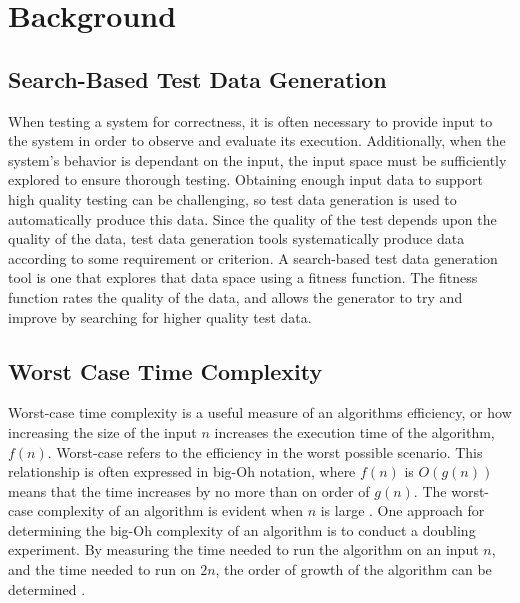 
\section{Background}


\subsection{Search-Based Test Data Generation}
When testing a system for correctness, it is often necessary to
provide input to the system in order to observe and evaluate its
execution. Additionally, when the system's behavior is dependant on the
input, the input space must be sufficiently explored to ensure thorough
testing.  Obtaining enough input data to support high quality testing can
be challenging, so test data generation is used to automatically
produce this data. Since the quality of the test depends upon the
quality of the data, test data generation tools systematically produce data
according to some requirement or criterion. A search-based test data 
generation tool is one that explores that data space using a fitness
function.  The fitness function rates the quality of the data, and allows
the generator to try and improve by searching for higher quality test data.




\subsection{Worst Case Time Complexity}

Worst-case time complexity is a useful measure of an algorithms
efficiency, or how increasing the size
of the input $n$ increases the execution time of the algorithm, $f(n)$.
Worst-case refers to the efficiency in the worst possible scenario.
This relationship is often expressed in big-Oh notation, where $f(n)$
is $O(g(n))$ means that the time increases by no more than on order of $g(n)$. The
worst-case complexity of an algorithm is evident when $n$ is large 
\cite{Goodrich:Data}. One approach for determining the big-Oh complexity
of an algorithm is to conduct a doubling experiment. By measuring the
time needed to run the algorithm on an input $n$, and the time needed to
run on $2n$, the order of growth of the algorithm can be determined
\cite{McGeoch2012,Sedgewick:Analysis}. 

